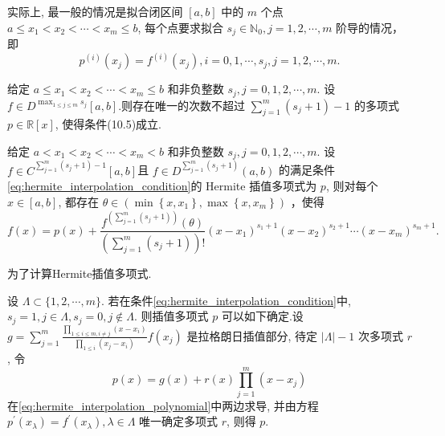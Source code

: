 实际上, 最一般的情况是拟合闭区间 $[a, b]$ 中的 $m$ 个点 $a \leqslant x_1<x_2<\cdots<x_m \leqslant b$, 每个点要求拟合 $s_j \in \mathbb{N}_0, j=1,2, \cdots, m$ 阶导的情况，即
\begin{equation}\label{eq:hermite_interpolation_condition}
    p^{(i)}\left(x_j\right)=f^{(i)}\left(x_j\right), i=0,1, \cdots, s_j, j=1,2, \cdots, m .
\end{equation}
\begin{proposition}
    给定 $a \leqslant x_1<x_2<\cdots<x_m \leqslant b$ 和非负整数 $s_j, j=0,1,2, \cdots, m$. 设 $f \in D^{\max _{1 \leqslant j \leqslant m} s_j}[a, b]$.则存在唯一的次数不超过 $\sum_{j=1}^m\left(s_j+1\right)-1$ 的多项式 $p \in \mathbb{R}[x]$, 使得条件(10.5)成立.
\end{proposition}
\begin{theorem}
    给定 $a<x_1<x_2<\cdots<x_m<b$ 和非负整数 $s_j, j=0,1,2, \cdots, m$. 设 $f \in C^{\sum_{j=1}^m\left(s_j+1\right)-1}[a, b]$且 $f \in D^{\sum_{j=1}^m\left(s_j+1\right)}(a, b)$ 的满足条件\eqref{eq:hermite_interpolation_condition}的 Hermite 插值多项式为 $p$, 则对每个 $x \in[a, b]$, 都存在 $\theta \in\left(\min \left\{x, x_1\right\}, \max \left\{x, x_m\right\}\right)$ ，使得
    $$
        f(x)=p(x)+\frac{f^{\left(\sum_{j=1}^m\left(s_j+1\right)\right)}(\theta)}{\left(\sum_{j=1}^m\left(s_j+1\right)\right)!}\left(x-x_1\right)^{s_1+1}\left(x-x_2\right)^{s_2+1} \cdots\left(x-x_m\right)^{s_m+1} .
    $$
\end{theorem}
为了计算Hermite插值多项式.

设 $\Lambda \subset\{1,2, \cdots, m\}$. 若在条件\ref{eq:hermite_interpolation_condition}中, $s_j=1, j \in \Lambda, s_j=0, j \notin \Lambda$. 则插值多项式 $p$ 可以如下确定.设 $g=\sum_{j=1}^m \frac{\prod_{1 \leqslant i \leqslant m, i \neq j}\left(x-x_i\right)}{\prod_{1 \leqslant i}\left(x_j-x_i\right)} f\left(x_j\right)$ 是拉格朗日插值部分, 待定 $|\Lambda|-1$ 次多项式 $r$, 令
\begin{equation}\label{eq:hermite_interpolation_polynomial}
    p(x)=g(x)+r(x) \prod_{j=1}^m\left(x-x_j\right)
\end{equation}
在\ref{eq:hermite_interpolation_polynomial}中两边求导, 并由方程 $p^{\prime}\left(x_\lambda\right)=f^{\prime}\left(x_\lambda\right), \lambda \in \Lambda$ 唯一确定多项式 $r$, 则得 $p$.

